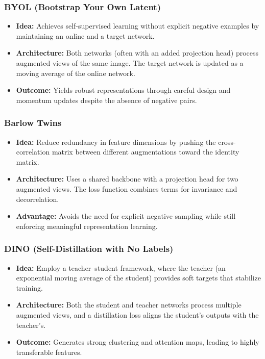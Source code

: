 \documentclass{article}
\begin{document}
\subsubsection{BYOL (Bootstrap Your Own Latent)}
\begin{itemize}
    \item \textbf{Idea:} Achieves self-supervised learning without explicit negative examples by maintaining an online and a target network.
    \item \textbf{Architecture:} Both networks (often with an added projection head) process augmented views of the same image. The target network is updated as a moving average of the online network.
    \item \textbf{Outcome:} Yields robust representations through careful design and momentum updates despite the absence of negative pairs.
\end{itemize}

\subsubsection{Barlow Twins}
\begin{itemize}
    \item \textbf{Idea:} Reduce redundancy in feature dimensions by pushing the cross-correlation matrix between different augmentations toward the identity matrix.
    \item \textbf{Architecture:} Uses a shared backbone with a projection head for two augmented views. The loss function combines terms for invariance and decorrelation.
    \item \textbf{Advantage:} Avoids the need for explicit negative sampling while still enforcing meaningful representation learning.
\end{itemize}

\subsubsection{DINO (Self-Distillation with No Labels)}
\begin{itemize}
    \item \textbf{Idea:} Employ a teacher--student framework, where the teacher (an exponential moving average of the student) provides soft targets that stabilize training.
    \item \textbf{Architecture:} Both the student and teacher networks process multiple augmented views, and a distillation loss aligns the student’s outputs with the teacher’s.
    \item \textbf{Outcome:} Generates strong clustering and attention maps, leading to highly transferable features.
\end{itemize}
\end{document}
